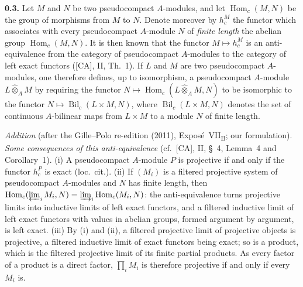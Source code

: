 
\medskip
\noindent\textbf{0.3.}
\label{sga3:VIIB:0.3}
Let \(M\) and \(N\) be two pseudocompact \(A\)-modules, and let
\(\operatorname{Hom}_c(M,N)\) be the group of morphisms from \(M\) to \(N\).
Denote moreover by \(h_c^M\) the functor which associates with every
pseudocompact \(A\)-module \(N\) of \emph{finite length} the abelian group
\(\operatorname{Hom}_c(M,N)\). It is then known that the functor
\(M\mapsto h_c^M\) is an anti-equivalence from the category of
pseudocompact \(A\)-modules to the category of left exact functors
(\textup{[CA]}, II, Th.~1). If \(L\) and \(M\) are two pseudocompact
\(A\)-modules, one therefore defines, up to isomorphism, a pseudocompact
\(A\)-module \(L\widehat{\otimes}_{A}M\) by requiring the functor
\(N\mapsto\operatorname{Hom}_{c}(L\widehat{\otimes}_{A}M,N)\) to be
isomorphic to the functor \(N\mapsto\operatorname{Bil}_{c}(L\times M,N)\),
where \(\operatorname{Bil}_{c}(L\times M,N)\) denotes the set of continuous
\(A\)-bilinear maps from \(L\times M\) to a module \(N\) of finite length.

\medskip\noindent
{}\label{sga3:VIIB:0.2.G}%
\emph{Addition} (after the Gille--Polo re-edition (2011), Expos\'e~VII\textsubscript{B}; our formulation).
\emph{Some consequences of this anti-equivalence} (cf.\ \textup{[CA]}, II, \S~4, Lemma~4 and
Corollary~1). (i) A pseudocompact \(A\)-module \(P\) is projective if and only if the functor
\(h_c^P\) is exact (loc.\ cit.). (ii) If \((M_i)\) is a filtered projective system of pseudocompact
\(A\)-modules and \(N\) has finite length, then
\(\operatorname{Hom}_c(\varprojlim_iM_i,N)=\varinjlim_i\operatorname{Hom}_c(M_i,N)\): the
anti-equivalence turns projective limits into inductive limits of left exact functors, and a
filtered inductive limit of left exact functors with values in abelian groups, formed argument by
argument, is left exact. (iii) By (i) and (ii), a filtered projective limit of projective objects is
projective, a filtered inductive limit of exact functors being exact; so is a product, which is the
filtered projective limit of its finite partial products. As every factor of a product is a direct
factor, \(\prod_iM_i\) is therefore projective if and only if every \(M_i\) is.

